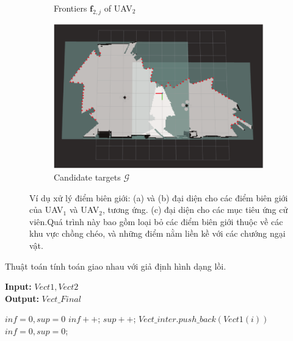 \documentclass[11pt,openany]{book}
\begin{document}
\begin{algorimth}[H]
\begin{figure}[H]
\begin{subfigure}[H]{0.6\linewidth}
        \caption{{Frontiers $\mathbf{f}_{2,j}$ of UAV$_2$}}
        \label{fig:3.5b}
    \end{subfigure}
    \begin{subfigure}[H]{0.6\linewidth}
        \centering
        \includegraphics[width=\linewidth]{assets/3_5_c.png}
        \caption{{Candidate targets $\mathcal{G}$}}
        \label{fig:3.5c}
    \end{subfigure}
    \caption{Ví dụ xử lý điểm biên giới: (a) và (b) đại diện cho các điểm biên giới của UAV$_1$ và UAV$_2$, tương ứng. (c) đại diện cho các mục tiêu ứng cử viên.Quá trình này bao gồm loại bỏ các điểm biên giới thuộc về các khu vực chồng chéo, và những điểm nằm liền kề với các chướng ngại vật.}
    \label{fig:3.5}
\end{figure}
\begin{algorithm}[H]
    \caption{Thuật toán tính toán giao nhau với giả định hình dạng lồi.}
    \label{alg:3.3}
    \hspace*{\algorithmicindent} \textbf{Input:} $Vect1, Vect2$ \\
    \hspace*{\algorithmicindent} \textbf{Output:} $Vect\_Final$
    \begin{algorithmic}[1]
        \STATE $inf = 0, sup = 0$
        \STATE $inf++$;
        \ELSE
        \STATE $sup++$;
        \ENDIF
        \ENDFOR
        \STATE $Vect\_inter.push\_back(Vect1(i))$
        \ENDIF
        \ENDFOR
        \STATE $inf=0,sup=0$;

\end{algorithmic}
\end{algorithm}
\end{algorimth}
\end{document}
